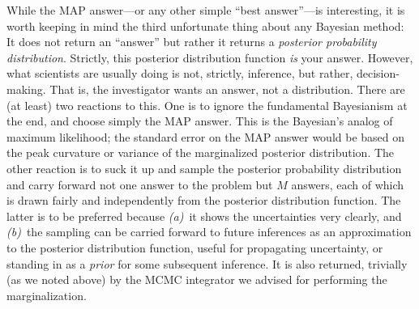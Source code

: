 \documentclass[12pt,twoside]{article}
\newcounter{problem}
\begin{document}
While the MAP answer---or any other simple ``best answer''---is
interesting, it is worth keeping in mind the third unfortunate thing
about any Bayesian method: It does not return an ``answer'' but rather
it returns a \emph{posterior probability distribution}.  Strictly,
this posterior distribution function \emph{is} your answer.  However,
what scientists are usually doing is not, strictly, inference, but
rather, decision-making.  That is, the investigator wants an answer,
not a distribution.  There are (at least) two reactions to this.  One
is to ignore the fundamental Bayesianism at the end, and choose simply
the MAP answer.  This is the Bayesian's analog of maximum likelihood;
the standard error on the MAP answer would be based on the peak
curvature or variance of the marginalized posterior distribution.  The
other reaction is to suck it up and sample the posterior probability
distribution and carry forward not one answer to the problem but $M$
answers, each of which is drawn fairly and independently from the
posterior distribution function.  The latter is to be preferred
because \textsl{(a)}~it shows the uncertainties very clearly, and
\textsl{(b)}~the sampling can be carried forward to future inferences
as an approximation to the posterior distribution function, useful for
propagating uncertainty, or standing in as a \emph{prior} for some
subsequent inference.  It is also returned, trivially (as we noted
above) by the MCMC integrator we advised for performing the
marginalization.
\end{document}
